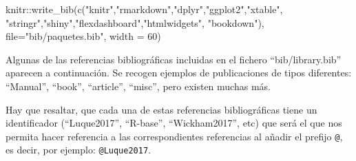 \documentclass[12pt,a4paper,]{book}
\newenvironment{Shaded}{\begin{snugshade}}{\end{snugshade}}
\newcommand{\AttributeTok}[1]{\textcolor[rgb]{0.77,0.63,0.00}{#1}}
\newcommand{\DecValTok}[1]{\textcolor[rgb]{0.00,0.00,0.81}{#1}}
\newcommand{\FunctionTok}[1]{\textcolor[rgb]{0.00,0.00,0.00}{#1}}
\newcommand{\NormalTok}[1]{#1}
\newcommand{\SpecialCharTok}[1]{\textcolor[rgb]{0.00,0.00,0.00}{#1}}
\newcommand{\StringTok}[1]{\textcolor[rgb]{0.31,0.60,0.02}{#1}}
\numberwithin{dummy}{section}
\theoremstyle{ocrenumbox}
\theoremstyle{blacknumex}
\theoremstyle{blacknumbox}
\theoremstyle{ocrenum}
\theoremstyle{ocrenum}
\begin{document}
\bigskip

\begin{Shaded}
\begin{Highlighting}[]
\NormalTok{knitr}\SpecialCharTok{::}\FunctionTok{write\_bib}\NormalTok{(}\FunctionTok{c}\NormalTok{(}\StringTok{"knitr"}\NormalTok{,}\StringTok{"rmarkdown"}\NormalTok{,}\StringTok{"dplyr"}\NormalTok{,}\StringTok{"ggplot2"}\NormalTok{,}\StringTok{"xtable"}\NormalTok{,}
                   \StringTok{"stringr"}\NormalTok{,}\StringTok{"shiny"}\NormalTok{,}\StringTok{"flexdashboard"}\NormalTok{,}\StringTok{"htmlwidgets"}\NormalTok{,}
                   \StringTok{"bookdown"}\NormalTok{),}
                 \AttributeTok{file=}\StringTok{"bib/paquetes.bib"}\NormalTok{, }
                 \AttributeTok{width =} \DecValTok{60}\NormalTok{)}
\end{Highlighting}
\end{Shaded}

Algunas de las referencias bibliográficas incluidas en el fichero
``bib/library.bib'' aparecen a continuación. Se recogen ejemplos de
publicaciones de tipos diferentes: ``Manual'', ``book'', ``article'',
``misc'', pero existen muchas más.

Hay que resaltar, que cada una de estas referencias bibliográficas tiene
un identificador (``Luque2017'', ``R-base'', ``Wickham2017'', etc) que
será el que nos permita hacer referencia a las correspondientes
referencias al añadir el prefijo \texttt{@}, es decir, por ejemplo:
\texttt{@Luque2017}.
\end{document}

